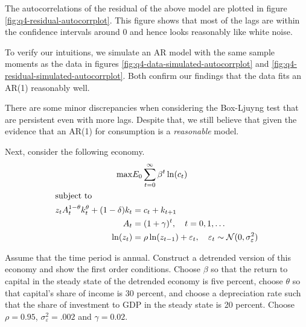 \documentclass[11pt]{article}
\begin{document}
\begin{enumerate}
The autocorrelations of the residual of the above model are plotted in figure \ref{fig:q4-residual-autocorrplot}. This figure shows that most of the lags are within the confidence intervals around 0 and hence looks reasonably like white noise.

To verify our intuitions, we simulate an AR model with the same sample moments as the data in figures \ref{fig:q4-data-simulated-autocorrplot} and \ref{fig:q4-residual-simulated-autocorrplot}. Both confirm our findings that the data fits an AR(1) reasonably well.

There are some minor discrepancies when considering the Box-Ljuyng test that are persistent even with more lags. Despite that, we still believe that given the evidence that an AR(1) for consumption is a {\itshape reasonable} model.

\newpage
Next, consider the following economy.
\begin{align*}
\max & E_0 \sum^\infty_{t = 0}\beta^t \ln (c_t)\\
\intertext{subject to}
z_t A_t^{1 - \theta} k_t^\theta + (1 - \delta)k_t &= c_t + k_{t + 1}\\
A_t &= (1 + \gamma)^t, \quad t = 0, 1, \ldots \\
\ln(z_t) &= \rho \ln (z_{t - 1}) + \varepsilon_t,\quad \varepsilon_t \sim \mathcal{N}(0, \sigma^2_\varepsilon)
\end{align*}

Assume that the time period is annual. Construct a detrended version of
this economy and show the first order conditions. Choose $\beta$ so that the return
to capital in the steady state of the detrended economy is five percent, choose
$\theta$ so that capital’s share of income is 30 percent, and choose a depreciation rate
such that the share of investment to GDP in the steady state is 20 percent.
Choose $\rho = 0.95$, $\sigma^2_\varepsilon
 = .002$ and $\gamma = 0.02$.


\end{enumerate}
\end{document}
